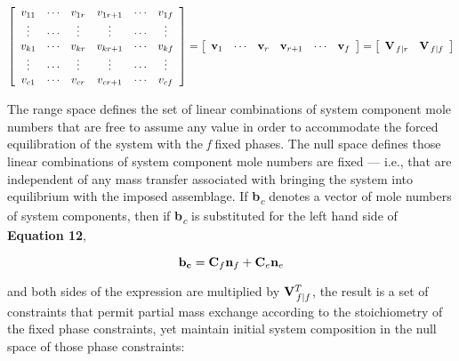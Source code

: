\documentclass[11pt, titlepage, twoside]{article}
\begin{document}
\begin{MPEquation}[!ht]
\begin{equation}
\left[ {\begin{array}{*{20}{c}}
{{v_{11}}}& \cdots &{{v_{1r}}}&{{v_{1r + 1}}}& \cdots &{{v_{1f}}}\\
 \vdots & \cdots & \vdots & \vdots & \cdots & \vdots \\
{{v_{k1}}}& \cdots &{{v_{kr}}}&{{v_{kr + 1}}}& \cdots &{{v_{kf}}}\\
 \vdots & \cdots & \vdots & \vdots & \cdots & \vdots \\
{{v_{c1}}}& \cdots &{{v_{cr}}}&{{v_{cr + 1}}}& \cdots &{{v_{cf}}}
\end{array}} \right] = \left[ {\begin{array}{*{20}{c}}
{{{\bf{v}}_1}}& \cdots &{{{\bf{v}}_r}}&{{{\bf{v}}_{r + 1}}}& \cdots &{{{\bf{v}}_f}}
\end{array}} \right] = \left[ {\begin{array}{*{20}{c}}
{{{\bf{V}}_{\left. f \right|r}}}&{{{\bf{V}}_{\left. f \right|f}}}
\end{array}} \right]
\end{equation}
\label{MPEquationElement:321FDC7D-3B55-49DD-F61A-84AD01924C77}
\end{MPEquation}
The range space defines the set of linear combinations of system component mole numbers that are free to assume any value in order to accommodate the forced equilibration of the system with the \emph{f} fixed phases. The null space defines those linear combinations of system component mole numbers are fixed --- i.e., that are independent of any mass transfer associated with bringing the system into equilibrium with the imposed assemblage. If \textbf{b}\textsubscript{\emph{c}} denotes a vector of mole numbers of system components, then if \textbf{b}\emph{\textsubscript{c}} is substituted for the left hand side of \textbf{Equation 12},


\begin{MPEquation}[!ht]
\begin{equation}
{\bf{b}_c} = {{\bf{C}}_f}{{\bf{n}}_f} + {{\bf{C}}_e}{{\bf{n}}_e}
\end{equation}
\label{MPEquationElement:EA1DAEF2-CBEE-48B7-82C7-A2F2F10E86BC}
\end{MPEquation}
and both sides of the expression are multiplied by ${\bf{V}}_{\left. f \right|f}^T$, the result is a set of constraints that permit partial mass exchange according to the stoichiometry of the fixed phase constraints, yet maintain initial system composition in the null space of those phase constraints:
\end{document}
